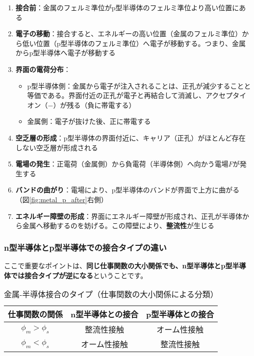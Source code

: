 \begin{enumerate}
\item \textbf{接合前}：金属のフェルミ準位がp型半導体のフェルミ準位より高い位置にある

\item \textbf{電子の移動}：接合すると、エネルギーの高い位置（金属のフェルミ準位）から低い位置（p型半導体のフェルミ準位）へ電子が移動する。つまり、金属からp型半導体へ電子が移動する

\item \textbf{界面の電荷分布}：
\begin{itemize}
\item p型半導体側：金属から電子が注入されることは、正孔が減少することと等価である。界面付近の正孔が電子と再結合して消滅し、アクセプタイオン（$-$）が残る（負に帯電する）
\item 金属側：電子が抜けた後、正に帯電する
\end{itemize}

\item \textbf{空乏層の形成}：p型半導体の界面付近に、キャリア（正孔）がほとんど存在しない空乏層が形成される

\item \textbf{電場の発生}：正電荷（金属側）から負電荷（半導体側）へ向かう電場$F$が発生する

\item \textbf{バンドの曲がり}：電場により、p型半導体のバンドが界面で上方に曲がる（図\ref{fig:metal_p_after}右側）

\item \textbf{エネルギー障壁の形成}：界面にエネルギー障壁が形成され、正孔が半導体から金属へ移動するのを妨げる。この障壁により、\textbf{整流性}が生じる
\end{enumerate}

\subsubsection{n型半導体とp型半導体での接合タイプの違い}

ここで重要なポイントは、\textbf{同じ仕事関数の大小関係でも、n型半導体とp型半導体では接合タイプが逆になる}ということです。

\begin{table}[H]
\centering
\caption{金属-半導体接合のタイプ（仕事関数の大小関係による分類）}
\begin{tabular}{|c|c|c|}
\hline
\textbf{仕事関数の関係} & \textbf{n型半導体との接合} & \textbf{p型半導体との接合} \\
\hline
$\phi_m > \phi_s$ & 整流性接触 & オーム性接触 \\
\hline
$\phi_m < \phi_s$ & オーム性接触 & 整流性接触 \\
\hline
\end{tabular}
\end{table}


